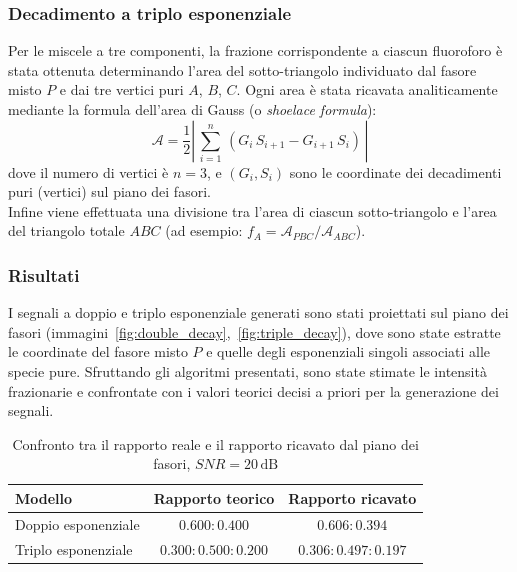 \subsubsection{Decadimento a triplo esponenziale}
Per le miscele a tre componenti, la frazione corrispondente a ciascun fluoroforo è stata ottenuta determinando l'area del sotto-triangolo individuato dal fasore misto $P$ e dai tre vertici puri $A$, $B$, $C$. Ogni area è stata ricavata analiticamente mediante la formula dell'area di Gauss (o \textit{shoelace formula}):
\begin{equation}
    \mathcal{A} = \frac{1}{2}\left|\,\sum_{i=1}^{n}\,(G_{i}\,S_{i+1}-G_{i+1}\,S_{i})\,\right|
    \label{eq:shoelace_formula}
\end{equation}
dove il numero di vertici è $n=3$, e $(G_i, S_i)$ sono le coordinate dei decadimenti puri (vertici) sul piano dei fasori.\\
Infine viene effettuata una divisione tra l'area di ciascun sotto-triangolo e l'area del triangolo totale $ABC$ (ad esempio: $f_A=\mathcal{A}_{PBC}/\mathcal{A}_{ABC}$).


\subsubsection{Risultati}
I segnali a doppio e triplo esponenziale generati sono stati proiettati sul piano dei fasori (immagini~\ref{fig:double_decay},~\ref{fig:triple_decay}), dove sono state estratte le coordinate del fasore misto $P$ e quelle degli esponenziali singoli associati alle specie pure. Sfruttando gli algoritmi presentati, sono state stimate le intensità frazionarie e confrontate con i valori teorici decisi a priori per la generazione dei segnali.
\begin{table}[h!]

    \centering
    \setlength{\tabcolsep}{8pt}

    \begin{tabular}{lcc}

        \hline
        Modello & Rapporto teorico & Rapporto ricavato \\
        \hline
        Doppio esponenziale & $0.600:0.400$  & $0.606:0.394$ \\
        Triplo esponenziale & $0.300:0.500:0.200$ & $0.306:0.497:0.197$ \\
        \hline

    \end{tabular}

    \caption{Confronto tra il rapporto reale e il rapporto ricavato dal piano dei fasori, $\textit{SNR}=20\,\text{dB}$}
    \label{tab:rapporti_23_exp}

\end{table}

